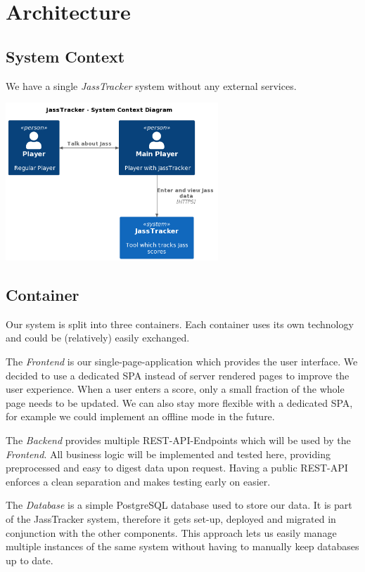 \chapter{Architecture}

\section{System Context}
We have a single \emph{JassTracker} system without any external services.

\includegraphics[width=0.6\textwidth]{resources/diagrams/c4-1-system-context}

\section{Container}
Our system is split into three containers.
Each container uses its own technology and could be (relatively) easily exchanged.

The \emph{Frontend} is our single-page-application which provides the user interface.
We decided to use a dedicated SPA instead of server rendered pages to improve the user experience.
When a user enters a score, only a small fraction of the whole page needs to be updated.
We can also stay more flexible with a dedicated SPA, for example we could implement an offline mode in the future.

The \emph{Backend} provides multiple REST-API-Endpoints which will be used by the \emph{Frontend}.
All business logic will be implemented and tested here, providing preprocessed and easy to digest data upon request.
Having a public REST-API enforces a clean separation and makes testing early on easier.

The \emph{Database} is a simple PostgreSQL database used to store our data.
It is part of the JassTracker system, therefore it gets set-up, deployed and migrated in conjunction with the other components.
This approach lets us easily manage multiple instances of the same system without having to manually keep databases up to date.

